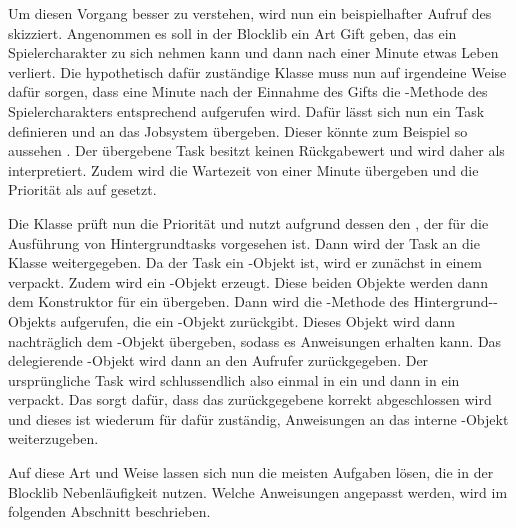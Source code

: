 \begin{figure}
	\centering
	
	\caption{}\label{fig:wrapper}
\end{figure}

Um diesen Vorgang besser zu verstehen, wird nun ein beispielhafter Aufruf des  skizziert. Angenommen es soll in der Blocklib ein Art Gift geben, das ein Spielercharakter zu sich nehmen kann und dann nach einer Minute etwas Leben verliert. Die hypothetisch dafür zuständige Klasse muss nun auf irgendeine Weise dafür sorgen, dass eine Minute nach der Einnahme des Gifts die -Methode des Spielercharakters entsprechend aufgerufen wird. Dafür lässt sich nun ein Task definieren und an das Jobsystem übergeben. Dieser könnte zum Beispiel so aussehen . Der übergebene Task besitzt keinen Rückgabewert und wird daher als  interpretiert. Zudem wird die Wartezeit von einer Minute übergeben und die Priorität als auf  gesetzt.

Die Klasse  prüft nun die Priorität und nutzt aufgrund dessen den , der für die Ausführung von Hintergrundtasks vorgesehen ist. Dann wird der Task an die Klasse  weitergegeben. Da der Task ein -Objekt ist, wird er zunächst in einem  verpackt. Zudem wird ein -Objekt erzeugt. Diese beiden Objekte werden dann dem Konstruktor für ein  übergeben. Dann wird die -Methode des Hintergrund--Objekts aufgerufen, die ein -Objekt zurückgibt. Dieses Objekt wird dann nachträglich dem -Objekt übergeben, sodass es Anweisungen erhalten kann. Das delegierende -Objekt wird dann an den Aufrufer zurückgegeben. Der ursprüngliche Task wird schlussendlich also einmal in ein  und dann in ein  verpackt. Das  sorgt dafür, dass das zurückgegebene  korrekt abgeschlossen wird und dieses ist wiederum für dafür zuständig, Anweisungen an das interne -Objekt weiterzugeben.

Auf diese Art und Weise lassen sich nun die meisten Aufgaben lösen, die in der Blocklib Nebenläufigkeit nutzen. Welche Anweisungen angepasst werden, wird im folgenden Abschnitt beschrieben.

